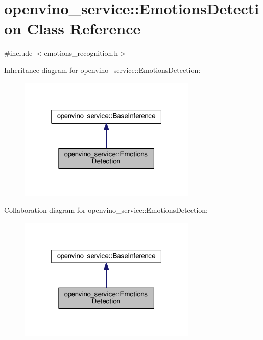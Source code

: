 \hypertarget{classopenvino__service_1_1EmotionsDetection}{}\section{openvino\+\_\+service\+:\+:Emotions\+Detection Class Reference}
\label{classopenvino__service_1_1EmotionsDetection}


{\ttfamily \#include $<$emotions\+\_\+recognition.\+h$>$}



Inheritance diagram for openvino\+\_\+service\+:\+:Emotions\+Detection\+:
\nopagebreak
\begin{figure}[H]
\begin{center}
\leavevmode
\includegraphics[width=241pt]{classopenvino__service_1_1EmotionsDetection__inherit__graph}
\end{center}
\end{figure}


Collaboration diagram for openvino\+\_\+service\+:\+:Emotions\+Detection\+:
\nopagebreak
\begin{figure}[H]
\begin{center}
\leavevmode
\includegraphics[width=241pt]{classopenvino__service_1_1EmotionsDetection__coll__graph}
\end{center}
\end{figure}
